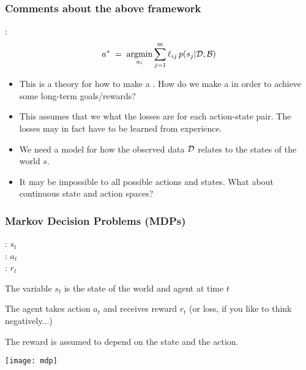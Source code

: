 \begin{frame}
\frametitle{Comments about the above framework}

:
\[
a^*\;=\;\underset{a_i}{\operatorname{argmin}} \sum_{j=1}^m \ell_{ij}\, p(s_j|\mathcal{D},{\cal B}) 
\]

\begin{itemize}
\item This is a theory for how to make a . How do
  we make a  in order to achieve some long-term
  goals/rewards?
\item This assumes that we  what the losses are for each
  action-state pair. The losses may in fact have to be learned from experience.
\item We need a model for how the observed data $\mathcal{D}$ relates to the
  states of the world $s$.
\item It may be impossible to  all possible
  actions and states. What about continuous state and action spaces?
\end{itemize}
\end{frame}

\begin{frame}
\frametitle{Markov Decision Problems (MDPs)}

: $s_t$\\
: $a_t$\\
: $r_t$

The variable $s_t$ is the state of the world and agent at time $t$

The agent takes action $a_t$ and receives reward $r_t$ (or loss, if
you like to think negatively...)

The reward is assumed to depend on the state and the action.

\centerline{\texttt{[image: mdp]}}

\end{frame}

